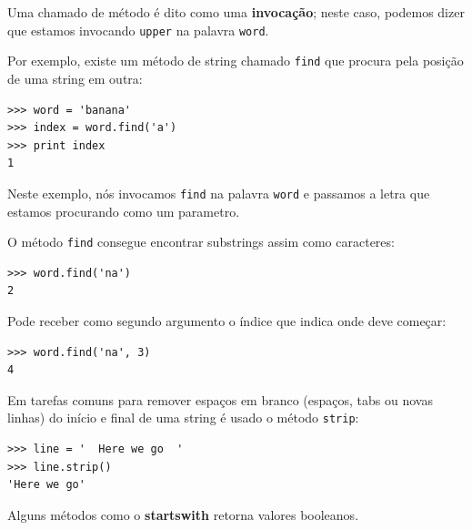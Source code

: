 {

Uma chamado de método é dito como uma {\bf invocação}; neste caso, podemos
dizer que estamos invocando {\tt upper} na palavra {\tt word}.



Por exemplo, existe um método de string chamado {\tt find} que procura pela
posição de uma string em outra:

\beforeverb
\begin{verbatim}
>>> word = 'banana'
>>> index = word.find('a')
>>> print index
1
\end{verbatim}
\afterverb
%
%
Neste exemplo, nós invocamos {\tt find} na palavra {\tt word} e passamos a
letra que estamos procurando como um parametro.


O método {\tt find} consegue  encontrar substrings assim como caracteres:

\beforeverb
\begin{verbatim}
>>> word.find('na')
2
\end{verbatim}
\afterverb
%
%
Pode receber como segundo argumento o índice que indica onde deve começar:


\beforeverb
\begin{verbatim}
>>> word.find('na', 3)
4
\end{verbatim}
\afterverb
%
%
Em tarefas comuns para remover espaços em branco (espaços, tabs ou novas
linhas) do início e final de uma string é usado o método {\tt strip}:

\beforeverb
\begin{verbatim}
>>> line = '  Here we go  '
>>> line.strip()
'Here we go'
\end{verbatim}
\afterverb
%
%
Alguns métodos como o {\bf startswith} retorna valores booleanos.

}
